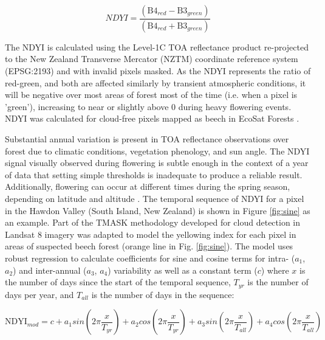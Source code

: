 \documentclass[remotesensing,article,submit,moreauthors,pdftex]{Definitions/mdpi}
\begin{document}
\begin{equation}
    NDYI = \frac{(\text{B4}_{red} - \text{B3}_{green})}{(\text{B4}_{red} + \text{B3}_{green})}
\end{equation}

The NDYI is calculated using the Level-1C TOA reflectance product re-projected to the New Zealand Transverse Mercator
(NZTM) coordinate reference system (EPSG:2193) and with invalid pixels masked. As the NDYI represents the ratio of
red-green, and both are affected similarly by transient atmospheric conditions, it will be negative over most areas of
forest most of the time (i.e. when a pixel is 'green'), increasing to near or slightly above 0 during heavy flowering events. NDYI was calculated for cloud-free pixels mapped as beech in EcoSat Forests \citep{Shepherd2005,Dymond2004,ecosatnorth,ecosatsouth}.

Substantial annual variation is present in TOA reflectance observations over forest due to climatic conditions,
vegetation phenology, and sun angle. The NDYI signal visually observed during flowering is subtle enough in the context
of a year of data that setting simple thresholds is inadequate to produce a reliable result. Additionally, flowering can
occur at different times during the spring season, depending on latitude and altitude \citep{Wardle1984,Allen2014}. The temporal sequence of NDYI for a pixel in the Hawdon
Valley (South Island, New Zealand) is shown in Figure \ref{fig:sine} as an example. Part of the TMASK methodology developed for cloud detection in
Landsat 8 imagery \citep{Zhu2014} was adapted to model the yellowing index for each pixel in areas of suspected beech
forest (orange line in Fig. \ref{fig:sine}). The model uses robust regression to calculate coefficients for sine and
cosine terms for intra- ($a_1$, $a_2$) and inter-annual ($a_3$, $a_4$) variability as well as a constant term ($c$)
where $x$ is the number of days since the start of the temporal sequence, $T_{yr}$ is the number of days per year, and $T_{all}$ is the number of days in the sequence:

\begin{equation}
    \text{NDYI}_{mod} = c + a_1sin(2\pi\frac{x}{T_{yr}}) + a_2cos(2\pi\frac{x}{T_{yr}}) + a_3sin(2\pi\frac{x}{T_{all}}) + a_4cos(2\pi\frac{x}{T_{all}})
\end{equation}
\end{document}
